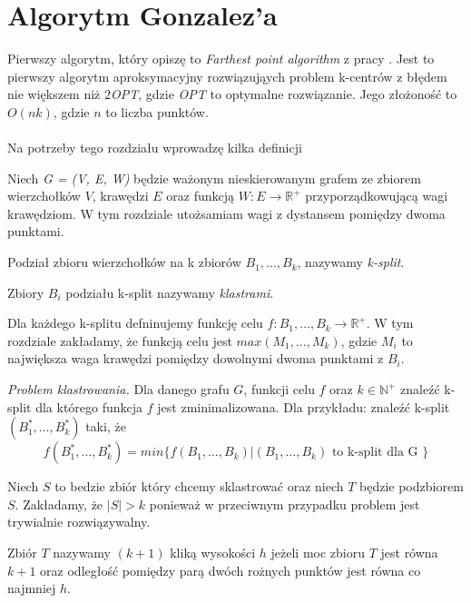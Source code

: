 \section{Algorytm Gonzalez'a}

Pierwszy algorytm, który opiszę to \textit{Farthest point algorithm} z pracy \cite{Gonzalez1985ClusteringTM}.
Jest to pierwszy algorytm aproksymacyjny rozwiązująych problem k-centrów z błędem nie większem niż $2$\textit{OPT}, gdzie \textit{OPT} to optymalne rozwiązanie.
Jego złożoność to $O(nk)$, gdzie $n$ to liczba punktów. 
\\~\\
Na potrzeby tego rozdziału wprowadzę kilka definicji

\begin{definition}
    Niech \emph{G = (V, E, W)} będzie ważonym nieskierowanym grafem ze zbiorem wierzchołków $V$, krawędzi $E$ oraz funkcją $W: E \rightarrow \mathbb{R}^{+}$ przyporządkowującą wagi krawędziom. 
    W tym rozdziale utożsamiam wagi z dystansem pomiędzy dwoma punktami. 
\end{definition}

\begin{definition}
    Podział zbioru wierzchołków na k zbiorów $B_{1},\dots,B_{k}$, nazywamy \emph{k-split}.
\end{definition}

\begin{definition}
    Zbiory $B_{i}$ podziału k-split nazywamy \emph{klastrami}.
\end{definition}

\noindent
Dla każdego k-splitu defninujemy funkcję celu $f: B_{1},\dots,B_{k} \rightarrow \mathbb{R}^{+}$.
W tym rozdziale zakładamy, że funkcją celu jest $max(M_{1},\dots,M_{k})$, gdzie $M_{i}$ to największa waga krawędzi pomiędzy dowolnymi dwoma punktami z $B_{i}$.

\begin{definition}
    \emph{Problem klastrowania.} Dla danego grafu $G$, funkcji celu $f$ oraz $k \in \mathbb{N}^{+}$ znaleźć k-split dla którego funkcja $f$ jest zminimalizowana.
    Dla przykładu: znaleźć k-split $(B_{1}^{*},\dots,B_{k}^{*})$ taki, że 
    \begin{equation}
        f(B_{1}^{*},\dots,B_{k}^{*}) = min\{ f(B_{1},\dots,B_{k}) | (B_{1},\dots,B_{k}) \text{ to k-split dla G } \}
    \end{equation}
\end{definition}

\noindent
Niech $S$ to bedzie zbiór który chcemy sklastrować oraz niech $T$ będzie podzbiorem $S$.
Zakładamy, że $|S| > k$ ponieważ w przeciwnym przypadku problem jest trywialnie rozwiązywalny.
\begin{definition}
Zbiór $T$ nazywamy $(k+1)$ kliką wysokości $h$ jeżeli moc zbioru $T$ jest równa $k+1$ oraz odległość pomiędzy parą dwóch rożnych punktów jest równa co najmniej $h$. 
\end{definition}

